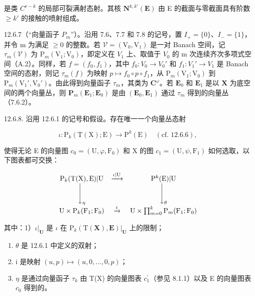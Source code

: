 是类 \(C^{r-k}\) 的局部可裂满射态射。其核 \(\mathbf{N}^{k,k'}(\mathbf{E})\) 由 E 的截面与零截面具有阶数 \(\geqslant k'\) 的接触的喷射组成。

12.6.7（“向量函子 \(P_{m}\)”）。沿用 7.6、7.7 和 7.8 的记号，置 \(I_{+} = \{0\}\)、\(I_{-} = \{1\}\)，并令 m 为满足 \(\geqslant 0\) 的整数。若 \(\mathcal{V} = (\mathrm{V}_{0}, \mathrm{V}_{1})\) 是一对 Banach 空间，记 \(\tau_{m}(\mathcal{V})\) 为 \(\mathrm{P}_{m}(\mathrm{V}_{1}; \mathrm{V}_{0})\)，即定义在 \(V_{1}\) 上、取值于 \(V_{0}\) 的 m 次连续齐次多项式空间（A.2）。同样，若 \(f = (f_{0}, f_{1})\)，其中 \(f_{0}: V_{0} \to V_{0}'\) 和 \(f_{1}: V_{1}' \to V_{1}\) 是 Banach 空间的态射，则记 \(\tau_{m}(f)\) 为映射 \(p \mapsto f_{0} \circ p \circ f_{1}\)，从 \(\mathrm{P}_{m}(\mathrm{V}_{1}; \mathrm{V}_{0})\) 到 \(\mathrm{P}_{m}(\mathrm{V}_{1}', \mathrm{V}_{0}')\)。由此得到向量函子 \(\tau_{m}\)，其类为 \(\mathbf{C}^{\omega}\)。若 \(\mathbf{E}_{0}\) 和 \(\mathbf{E}_{1}\) 是以 \(\mathbf{X}\) 为底空间的两个向量丛，则 \(\mathbf{P}_{m}(\mathbf{E}_{1};\mathbf{E}_{0})\) 是由 \((\mathbf{E}_{0},\mathbf{E}_{1})\) 通过 \(\tau_{m}\) 得到的向量丛（7.6.2）。

12.6.8. 沿用 12.6.1 的记号和假设。存在唯一一个向量丛态射

\[
\iota\colon\mathrm{P}_{k}(\mathrm{T}(\mathrm{X});\mathrm{E})\rightarrow\mathrm{P}^{k}(\mathrm{E})\quad(\text{cf. 12.6.6}),
\]

使得无论 E 的向量图 \(c_{0} = (\mathrm{U}, \varphi, \mathrm{F}_{0})\) 和 X 的图 \(c_{1} = (\mathrm{U}, \psi, \mathrm{F}_{1})\) 如何选取，以下图表都可交换：

\[
\begin{array}{c c c} \mathrm{P} _ {k} (\mathrm{T} (\mathrm{X}), \mathrm{E}) | \mathrm{U} & \xrightarrow {\iota | \mathrm{U}} & \mathrm{P} ^ {k} (\mathrm{E}) | \mathrm{U} \\ \Biggl \downarrow_ {\eta} & & \Biggl \downarrow_ {\theta} \\ \mathrm{U} \times \mathrm{P} _ {k} (\mathrm{F} _ {1}; \mathrm{F} _ {0}) & \xrightarrow {i} & \mathrm{U} \times \prod_ {m = 0} ^ {k} \mathrm{P} _ {m} (\mathrm{F} _ {1}; \mathrm{F} _ {0}) \end{array}
\]

其中：1）\(\iota|_{\mathbf{U}}\) 是 \(\iota\) 在 \(\mathrm{P}_{k}(\mathrm{T}(\mathbf{X}),\mathbf{E})|_{\mathbf{U}}\) 上的限制；

\begin{enumerate}
\def\labelenumi{\arabic{enumi})}
\setcounter{enumi}{1}
\item
  \(\theta\) 是 12.6.1 中定义的双射；
\item
  i 是映射 \((u, p) \mapsto (u, 0, \ldots, 0, p)\)；
\item
  \(\eta\) 是通过向量函子 \(\tau_{k}\) 由 T(X) 的向量图表 \(c_{1}^{\prime}\)（参见 8.1.1）以及 E 的向量图表 \(c_{0}\) 得到的。
\end{enumerate}

